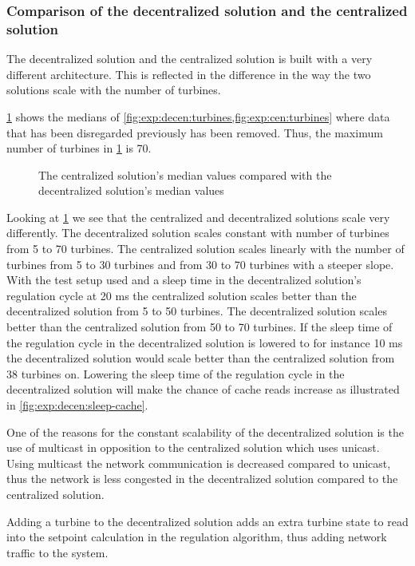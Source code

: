 \subsubsection{Comparison of the decentralized solution and the centralized solution}
\label{sec:comp:decentralizedVScentralized}
The decentralized solution and the centralized solution is built with a very different architecture. This is reflected in the difference in the way the two solutions scale with the number of turbines.

\cref{fig:exp:cenVSDecen} shows the medians of \cref{fig:exp:decen:turbines,fig:exp:cen:turbines} where data that has been disregarded previously has been removed. Thus, the maximum number of turbines in \cref{fig:exp:cenVSDecen} is 70. 

\begin{figure}[h!]
	\centering
		
	\caption{The centralized solution's median values compared with the decentralized solution's median values}
	\label{fig:exp:cenVSDecen}
\end{figure}

Looking at \cref{fig:exp:cenVSDecen} we see that the centralized and decentralized solutions scale very differently.
The decentralized solution scales constant with number of turbines from 5 to 70 turbines. The centralized solution scales linearly with the number of turbines from 5 to 30 turbines and from 30 to 70 turbines with a steeper slope. With the test setup used and a sleep time in the decentralized solution's regulation cycle at 20 ms the centralized solution scales better than the decentralized solution from 5 to 50 turbines. The decentralized solution scales better than the centralized solution from 50 to 70 turbines.
If the sleep time of the regulation cycle in the decentralized solution is lowered to for instance 10 ms the decentralized solution would scale better than the centralized solution from 38 turbines on. Lowering the sleep time of the regulation cycle in the decentralized solution will make the chance of cache reads increase as illustrated in \cref{fig:exp:decen:sleep-cache}.

One of the reasons for the constant scalability of the decentralized solution is the use of multicast in opposition to the centralized solution which uses unicast.
Using multicast the network communication is decreased compared to unicast, thus the network is less congested in the decentralized solution compared to the centralized solution.

Adding a turbine to the decentralized solution adds an extra turbine state to read into the setpoint calculation in the regulation algorithm, thus adding network traffic to the system.

